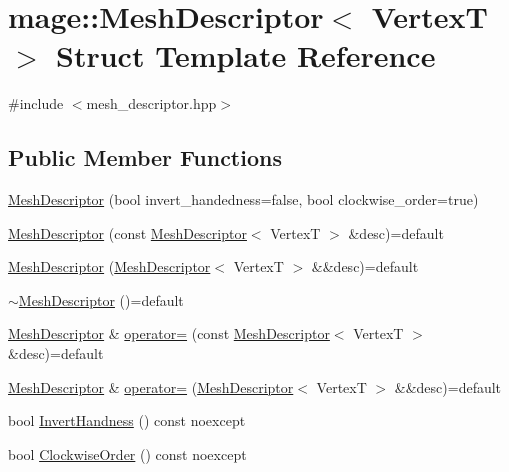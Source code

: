 \hypertarget{structmage_1_1_mesh_descriptor}{}\section{mage\+:\+:Mesh\+Descriptor$<$ VertexT $>$ Struct Template Reference}
\label{structmage_1_1_mesh_descriptor}


{\ttfamily \#include $<$mesh\+\_\+descriptor.\+hpp$>$}

\subsection*{Public Member Functions}
\begin{DoxyCompactItemize}
\item 
\hyperlink{structmage_1_1_mesh_descriptor_ae9c4651675fc0600fca01f0614c70762}{Mesh\+Descriptor} (bool invert\+\_\+handedness=false, bool clockwise\+\_\+order=true)
\item 
\hyperlink{structmage_1_1_mesh_descriptor_ab6347b2a60fbdf11573ddfe9283616d4}{Mesh\+Descriptor} (const \hyperlink{structmage_1_1_mesh_descriptor}{Mesh\+Descriptor}$<$ VertexT $>$ \&desc)=default
\item 
\hyperlink{structmage_1_1_mesh_descriptor_a62de61d0ea1ad1a514246f40e21c9faa}{Mesh\+Descriptor} (\hyperlink{structmage_1_1_mesh_descriptor}{Mesh\+Descriptor}$<$ VertexT $>$ \&\&desc)=default
\item 
\hyperlink{structmage_1_1_mesh_descriptor_adca32db164ab3032164c8dfe17af3db4}{$\sim$\+Mesh\+Descriptor} ()=default
\item 
\hyperlink{structmage_1_1_mesh_descriptor}{Mesh\+Descriptor} \& \hyperlink{structmage_1_1_mesh_descriptor_aef6a9568a8d4516dbeff4d8f665ca213}{operator=} (const \hyperlink{structmage_1_1_mesh_descriptor}{Mesh\+Descriptor}$<$ VertexT $>$ \&desc)=default
\item 
\hyperlink{structmage_1_1_mesh_descriptor}{Mesh\+Descriptor} \& \hyperlink{structmage_1_1_mesh_descriptor_aee596eaa945924860d9a26daa58d8f45}{operator=} (\hyperlink{structmage_1_1_mesh_descriptor}{Mesh\+Descriptor}$<$ VertexT $>$ \&\&desc)=default
\item 
bool \hyperlink{structmage_1_1_mesh_descriptor_ad16f81c7c37875e3eba4a6c0dd0613fb}{Invert\+Handness} () const noexcept
\item 
bool \hyperlink{structmage_1_1_mesh_descriptor_a7688db7ad2d756fff137f242120c8d25}{Clockwise\+Order} () const noexcept
\end{DoxyCompactItemize}
